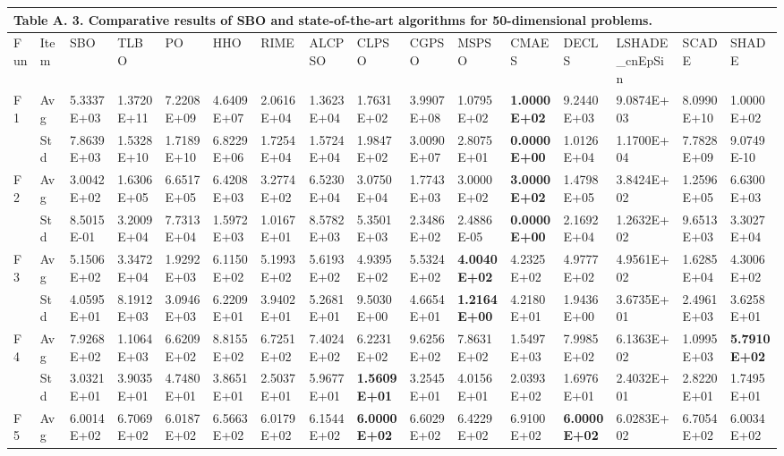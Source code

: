 \documentclass{article} %
\begin{document}
\begin{tabular}{|p{0.3in}|p{0.3in}|p{0.3in}|p{0.3in}|p{0.3in}|p{0.3in}|p{0.3in}|p{0.3in}|p{0.3in}|p{0.3in}|p{0.3in}|p{0.3in}|p{0.3in}|p{0.3in}|p{0.3in}|p{0.5in}|} \hline 
\multicolumn{16}{|p{4.8in}|}{\textbf{Table A. }3\textbf{. }Comparative results of SBO and state-of-the-art algorithms for 50-dimensional problems.\textbf{}} \\ \hline 
Fun & Item & SBO & TLBO & PO & HHO & RIME & ALCPSO & CLPSO & CGPSO & MSPSO & CMAES & DECLS & LSHADE\_cnEpSin & SCADE & SHADE \\ \hline 
F1 & Avg & 5.3337E+03 & 1.3720E+11 & 7.2208E+09 & 4.6409E+07 & 2.0616E+04 & 1.3623E+04 & 1.7631E+02 & 3.9907E+08 & 1.0795E+02 & \textbf{1.0000E+02} & 9.2440E+03 & 9.0874E+03 & 8.0990E+10 & 1.0000E+02 \\ \hline 
 & Std & 7.8639E+03 & 1.5328E+10 & 1.7189E+10 & 6.8229E+06 & 1.7254E+04 & 1.5724E+04 & 1.9847E+02 & 3.0090E+07 & 2.8075E+01 & \textbf{0.0000E+00} & 1.0126E+04 & 1.1700E+04 & 7.7828E+09 & 9.0749E-10 \\ \hline 
F2 & Avg & 3.0042E+02 & 1.6306E+05 & 6.6517E+05 & 6.4208E+03 & 3.2774E+02 & 6.5230E+04 & 3.0750E+04 & 1.7743E+03 & 3.0000E+02 & \textbf{3.0000E+02} & 1.4798E+05 & 3.8424E+02 & 1.2596E+05 & 6.6300E+03 \\ \hline 
 & Std & 8.5015E-01 & 3.2009E+04 & 7.7313E+04 & 1.5972E+03 & 1.0167E+01 & 8.5782E+03 & 5.3501E+03 & 2.3486E+02 & 2.4886E-05 & \textbf{0.0000E+00} & 2.1692E+04 & 1.2632E+02 & 9.6513E+03 & 3.3027E+04 \\ \hline 
F3 & Avg & 5.1506E+02 & 3.3472E+04 & 1.9292E+03 & 6.1150E+02 & 5.1993E+02 & 5.6193E+02 & 4.9395E+02 & 5.5324E+02 & \textbf{4.0040E+02} & 4.2325E+02 & 4.9777E+02 & 4.9561E+02 & 1.6285E+04 & 4.3006E+02 \\ \hline 
 & Std & 4.0595E+01 & 8.1912E+03 & 3.0946E+03 & 6.2209E+01 & 3.9402E+01 & 5.2681E+01 & 9.5030E+00 & 4.6654E+01 & \textbf{1.2164E+00} & 4.2180E+01 & 1.9436E+00 & 3.6735E+01 & 2.4961E+03 & 3.6258E+01 \\ \hline 
F4 & Avg & 7.9268E+02 & 1.1064E+03 & 6.6209E+02 & 8.8155E+02 & 6.7251E+02 & 7.4024E+02 & 6.2231E+02 & 9.6256E+02 & 7.8631E+02 & 1.5497E+03 & 7.9985E+02 & 6.1363E+02 & 1.0995E+03 & \textbf{5.7910E+02} \\ \hline 
 & Std & 3.0321E+01 & 3.9035E+01 & 4.7480E+01 & 3.8651E+01 & 2.5037E+01 & 5.9677E+01 & \textbf{1.5609E+01} & 3.2545E+01 & 4.0156E+01 & 2.0393E+02 & 1.6976E+01 & 2.4032E+01 & 2.8220E+01 & 1.7495E+01 \\ \hline 
F5 & Avg & 6.0014E+02 & 6.7069E+02 & 6.0187E+02 & 6.5663E+02 & 6.0179E+02 & 6.1544E+02 & \textbf{6.0000E+02} & 6.6029E+02 & 6.4229E+02 & 6.9100E+02 & \textbf{6.0000E+02} & 6.0283E+02 & 6.7054E+02 & 6.0034E+02 \\ \hline 

\end{tabular}
\end{document}
